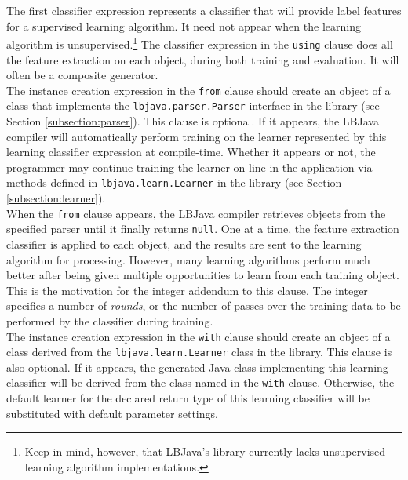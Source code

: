 \noindent
The first classifier expression represents a classifier that will provide
label features for a supervised learning algorithm.  It need not appear when
the learning algorithm is unsupervised.\footnote{Keep in mind, however, that
LBJava's library currently lacks unsupervised learning algorithm
implementations.}  The classifier expression in the {\tt using} clause does
all the feature extraction on each object, during both training and
evaluation.  It will often be a composite generator. \\

The instance creation expression in the {\tt from} clause should create an
object of a class that implements the {\tt lbjava.parser.Parser} interface in
the library (see Section \ref{subsection:parser}).  This clause is optional.
If it appears, the LBJava compiler will automatically perform training on the
learner represented by this learning classifier expression at compile-time.
Whether it appears or not, the programmer may continue training the learner
on-line in the application via methods defined in {\tt lbjava.learn.Learner} in
the library (see Section \ref{subsection:learner}). \\

When the {\tt from} clause appears, the LBJava compiler retrieves objects from
the specified parser until it finally returns {\tt null}.  One at a time, the
feature extraction classifier is applied to each object, and the results are
sent to the learning algorithm for processing.  However, many learning
algorithms perform much better after being given multiple opportunities to
learn from each training object.  This is the motivation for the integer
addendum to this clause.  The integer specifies a number of \emph{rounds}, or
the number of passes over the training data to be performed by the classifier
during training.  \\

The instance creation expression in the {\tt with} clause should create an
object of a class derived from the {\tt lbjava.learn.Learner} class in the
library.  This clause is also optional.  If it appears, the generated Java
class implementing this learning classifier will be derived from the class
named in the {\tt with} clause.  Otherwise, the default learner for the
declared return type of this learning classifier will be substituted with
default parameter settings. \\

